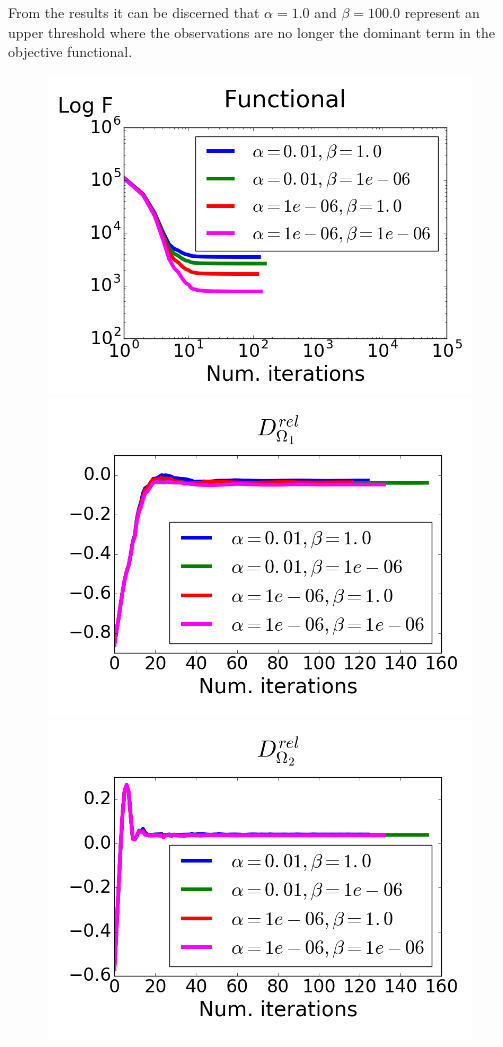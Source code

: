 \documentclass[11pt,a4paper]{article}
\begin{document}
From the results it can be discerned that $\alpha =1.0$ and $\beta=100.0$ represent an upper threshold where the observations are no longer the dominant term in the objective functional.  


\begin{figure}
\centering
\includegraphics[scale=0.2]{Convergence0}  
\includegraphics[scale=0.2]{Convergence1}  
\includegraphics[scale=0.2]{Convergence2}  

\end{figure}
\end{document}
